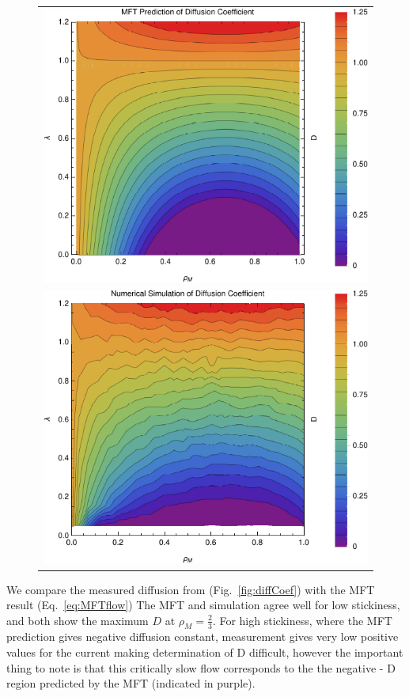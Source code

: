 \documentclass[
reprint,
 amsmath,amssymb,
 aps,
 prl
]{revtex4-1}
\begin{document}
\begin{figure}[h!]
\begin{center}
 \begin{tabular}{c}
    \includegraphics[width=0.98\linewidth]{newAnalFlow} \\
    \includegraphics[width=0.98\linewidth]{newDataFlow}
    \end{tabular}
\end{center}
    \vspace{-2em}
\end{figure}

We compare the measured diffusion from (Fig.~\ref{fig:diffCoef}) with the MFT result (Eq.~\ref{eq:MFTflow})
The MFT
and simulation agree well for low stickiness, and both show the 
maximum $D$ at $\rho_M = \frac{2}{3}$. For high stickiness, where the
MFT prediction gives negative diffusion constant, measurement gives 
very low positive values for the current making determination of D difficult, however 
the important thing to note is that this critically slow flow corresponds to the
the negative - D region predicted by the MFT (indicated in purple).
\end{document}
